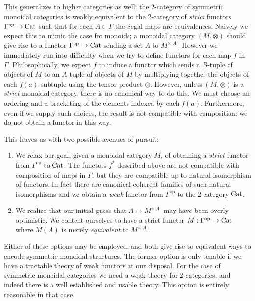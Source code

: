\documentclass[a4paper]{amsart}
\begin{document}
This generalizes to higher categories as well; the 2-category of symmetric monoidal categories is weakly equivalent to the 2-category of {\em strict} functors $\Gamma^{op} \to \mathrm{Cat}$ such that for each $A \in \Gamma$ the Segal maps are equivalences.
Naively we expect this to mimic the case for monoids; a monoidal category $(M, \otimes)$ should give rise to a functor $\Gamma^\text{op} \to \mathrm{Cat}$ sending a set $A$ to $M^{\times |A|}$. However we immediately run into difficulty when we try to define functors for each map $f$ in $\Gamma$. Philosophically, we expect $f$ to induce a functor which sends a $B$-tuple of objects of $M$ to an $A$-tuple of objects of $M$ by multiplying together the objects of each $f(a)$-subtuple using the tensor product $\otimes$. However, unless $(M, \otimes)$ is a {\em strict} monoidal category, there is no canonical way to do this. We must choose an ordering and a bracketing of the elements indexed by each $f(a)$. Furthermore, even if we supply such choices, the result is not compatible with composition; we do not obtain a functor in this way. 

This leaves us with two possible avenues of pursuit:
\begin{enumerate}
	\item We relax our goal, given a monoidal category $M$, of obtaining a {\em strict} functor from $\Gamma^\text{op}$ to $\mathrm{Cat}$. The functors $f^*$ described above are not compatible with composition of maps in $\Gamma$, but they are compatible up to natural isomorphism of functors. In fact there are canonical coherent families of such natural isomorphisms and we obtain a {\em weak} functor from $\Gamma^\text{op}$ to the 2-category $\mathrm{Cat}$. 
	\item We realize that our initial guess that $A \mapsto M^{\times |A|}$ may have been overly optimistic. We content ourselves to have a strict functor $M: \Gamma^\text{op} \to \mathrm{Cat}$ where $M(A)$ is merely {\em equivalent} to  $M^{\times |A|}$. 
\end{enumerate}
Either of these options may be employed, and both give rise to equivalent ways to encode symmetric monoidal structures. The former option is only tenable if we have a tractable theory of weak functors at our disposal. For the case of symmetric monoidal categories we need a weak theory for 2-categories, and indeed there is a well established and usable theory. This option is entirely reasonable in that case. 
\end{document}

